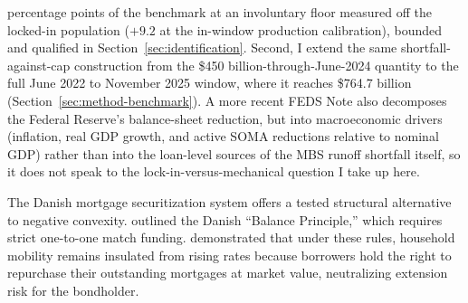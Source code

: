\documentclass[12pt]{article}
\begin{document}
percentage points of the benchmark at an involuntary floor measured off the locked-in population ($+9.2$ at the in-window production calibration), bounded and qualified in Section~\ref{sec:identification}. Second, I extend the same shortfall-against-cap construction from the \$450 billion-through-June-2024 quantity to the full June 2022 to November 2025 window, where it reaches \$764.7 billion (Section~\ref{sec:method-benchmark}). A more recent \citet{eyal2026} FEDS Note also decomposes the Federal Reserve's balance-sheet reduction, but into macroeconomic drivers (inflation, real GDP growth, and active SOMA reductions relative to nominal GDP) rather than into the loan-level sources of the MBS runoff shortfall itself, so it does not speak to the lock-in-versus-mechanical question I take up here.

The Danish mortgage securitization system offers a tested structural alternative to negative convexity. \citet{berg2018} outlined the Danish ``Balance Principle,'' which requires strict one-to-one match funding. \citet{berger2026} demonstrated that under these rules, household mobility remains insulated from rising rates because borrowers hold the right to repurchase their outstanding mortgages at market value, neutralizing extension risk for the bondholder.
\end{document}
